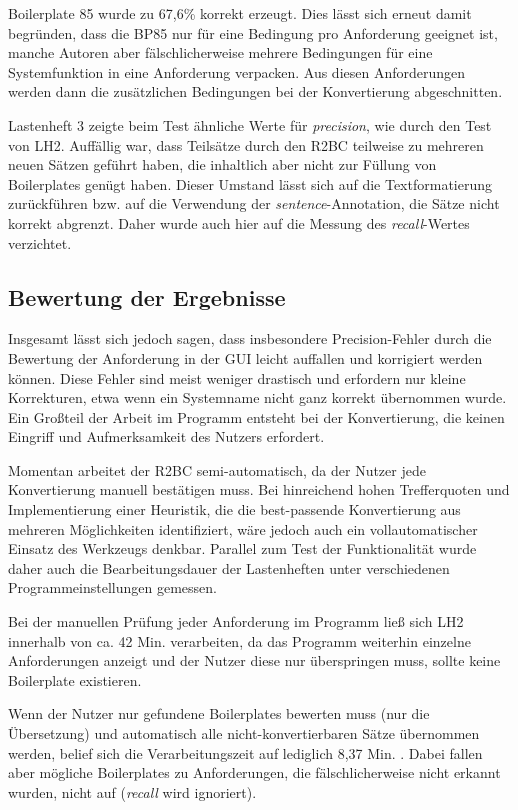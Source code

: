 \documentclass[12pt]{report}
\begin{document}
Boilerplate 85 wurde zu 67,6\% korrekt erzeugt. Dies lässt sich erneut damit begründen, dass die BP85 nur für eine Bedingung pro Anforderung geeignet ist, manche Autoren aber fälschlicherweise mehrere Bedingungen für eine Systemfunktion in eine Anforderung verpacken. Aus diesen Anforderungen werden dann die zusätzlichen Bedingungen bei der Konvertierung abgeschnitten.

\vspace{12pt}
Lastenheft 3 zeigte beim Test ähnliche Werte für \textit{precision}, wie durch den Test von LH2. Auffällig war, dass Teilsätze durch den R2BC teilweise zu mehreren neuen Sätzen geführt haben, die inhaltlich aber nicht zur Füllung von Boilerplates genügt haben. Dieser Umstand lässt sich auf die Textformatierung zurückführen bzw. auf die Verwendung der \textit{sentence}-Annotation, die Sätze nicht korrekt abgrenzt. Daher wurde auch hier auf die Messung des \textit{recall}-Wertes verzichtet.

\subsection{Bewertung der Ergebnisse}
Insgesamt lässt sich jedoch sagen, dass insbesondere Precision-Fehler durch die Bewertung der Anforderung in der GUI leicht auffallen und korrigiert werden können. Diese Fehler sind meist weniger drastisch und erfordern nur kleine Korrekturen, etwa wenn ein Systemname nicht ganz korrekt übernommen wurde. Ein Großteil der Arbeit im Programm entsteht bei der Konvertierung, die keinen Eingriff und Aufmerksamkeit des Nutzers erfordert.  

Momentan arbeitet der R2BC semi-automatisch, da der Nutzer jede Konvertierung manuell bestätigen muss. Bei hinreichend hohen Trefferquoten und Implementierung einer Heuristik, die die best-passende Konvertierung aus mehreren Möglichkeiten identifiziert, wäre jedoch auch ein vollautomatischer Einsatz des Werkzeugs denkbar. Parallel zum Test der Funktionalität wurde daher auch die Bearbeitungsdauer der Lastenheften unter verschiedenen Programmeinstellungen gemessen. 

Bei der manuellen Prüfung jeder Anforderung im Programm ließ sich LH2 innerhalb von ca. 42 Min. verarbeiten, da das Programm weiterhin einzelne Anforderungen anzeigt und der Nutzer diese nur überspringen muss, sollte keine Boilerplate existieren. 

Wenn der Nutzer nur gefundene Boilerplates bewerten muss (nur die Übersetzung) und automatisch alle nicht-konvertierbaren Sätze übernommen werden, belief sich die Verarbeitungszeit auf lediglich 8,37 Min. . Dabei fallen aber mögliche Boilerplates zu Anforderungen, die fälschlicherweise nicht erkannt wurden, nicht auf (\textit{recall} wird ignoriert).
\end{document}
